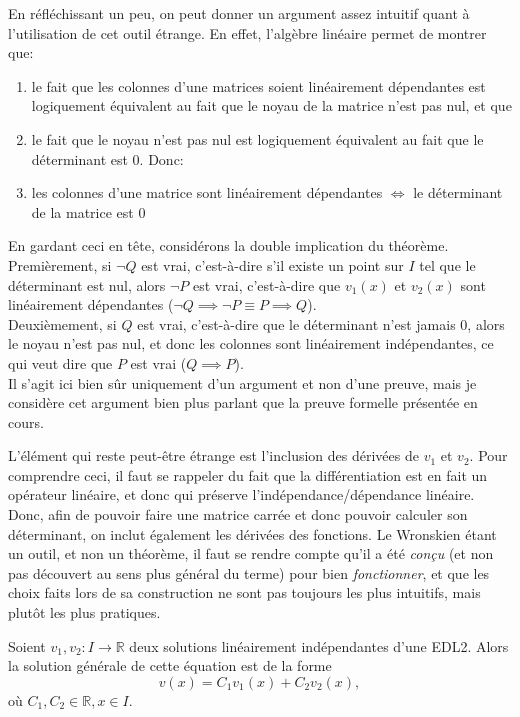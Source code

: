 \documentclass{report}
\begin{document}
En réfléchissant un peu, on peut donner un argument assez intuitif quant à l'utilisation de cet outil étrange. En effet, l'algèbre linéaire permet de montrer que:
\begin{enumerate}
	\item le fait que les colonnes d'une matrices soient linéairement dépendantes est logiquement équivalent au fait que le noyau de la matrice n'est pas nul, et que
	\item le fait que le noyau n'est pas nul est logiquement équivalent au fait que le déterminant est 0. Donc:
	\item les colonnes d'une matrice sont linéairement dépendantes $\iff$ le déterminant de la matrice est 0
\end{enumerate}
 En gardant ceci en tête, considérons la double implication du théorème. \\
Premièrement, si $\neg Q$ est vrai, c'est-à-dire s'il existe un point sur $I$ tel que le déterminant est nul, alors $\neg P$ est vrai, c'est-à-dire que $v_1(x)$ et $v_2(x)$ sont linéairement dépendantes ($\neg Q \implies \neg P \equiv P \implies Q$). \\ Deuxièmement, si $Q$ est vrai, c'est-à-dire que le déterminant n'est jamais 0, alors le noyau n'est pas nul, et donc les colonnes sont linéairement indépendantes, ce qui veut dire que $P$ est vrai ($Q \implies P$). \\
Il s'agit ici bien sûr uniquement d'un argument et non d'une preuve, mais je considère cet argument bien plus parlant que la preuve formelle présentée en cours. \par
L'élément qui reste peut-être étrange est l'inclusion des dérivées de $v_1$ et $v_2$. Pour comprendre ceci, il faut se rappeler du fait que la différentiation est en fait un opérateur linéaire, et donc qui préserve l'indépendance/dépendance linéaire. Donc, afin de pouvoir faire une matrice carrée et donc pouvoir calculer son déterminant, on inclut également les dérivées des fonctions. Le Wronskien étant un outil, et non un théorème, il faut se rendre compte qu'il a été \emph{conçu} (et non pas découvert au sens plus général du terme) pour bien \emph{fonctionner}, et que les choix faits lors de sa construction ne sont pas toujours les plus intuitifs, mais plutôt les plus pratiques.

\begin{thm}
	Soient $v_1, v_2 : I \to \mathbb R$ deux solutions linéairement indépendantes d'une EDL2. Alors la solution générale de cette équation est de la forme
	\begin{equation}
		v(x) = C_1 v_1(x) + C_2 v_2(x),
	\end{equation}
où $C_1, C_2 \in \mathbb R, x \in I$.
\end{thm}
\end{document}
